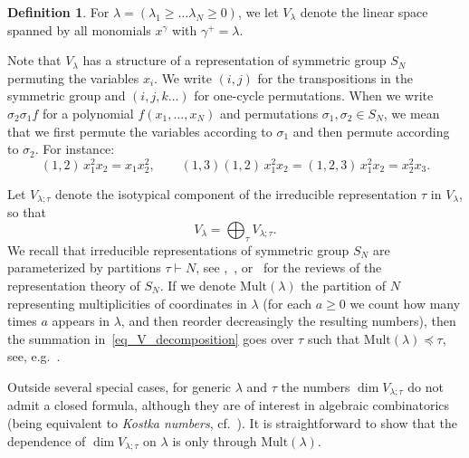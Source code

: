 \documentclass[11pt]{article}
\theoremstyle{definition}
\newtheorem{defi}[theo]{Definition}
\numberwithin{equation}{section}
\begin{document}
\begin{defi} \label{Definition_V_lambda}
 For $\lambda=(\lambda_1\ge\dots\lambda_N\ge 0)$, we let $V_\lambda$ denote the linear space spanned by all monomials $x^{\gamma}$ with $\gamma^+=\lambda$.
\end{defi}

Note that $V_\lambda$ has a structure of a representation of symmetric group $S_N$ permuting the variables $x_i$. We write $(i,j)$ for the transpositions in the symmetric group and $(i,j,k\dots)$ for one-cycle permutations. When we write $\sigma_2 \sigma_1 f$ for a polynomial $f(x_1,\dots,x_N)$ and permutations $\sigma_1,\sigma_2\in S_N$, we mean that we first permute the variables according to $\sigma_1$ and then permute according to $\sigma_2$. For instance:
$$
 (1,2)\, x_1^2 x_2 = x_1 x_2^2,\qquad (1,3) (1,2)\, x_1^2 x_2 = (1,2,3)\, x_1^2 x_2= x_2^2 x_3.
$$

Let $V_{\lambda;\tau}$ denote the isotypical component of the irreducible representation $\tau$ in $V_\lambda$, so that
\begin{equation}
\label{eq_V_decomposition}
 V_\lambda=\bigoplus_{\tau} V_{\lambda;\tau}.
\end{equation}
We recall that irreducible representations of symmetric group $S_N$ are parameterized by partitions $\tau\vdash N$, see \cite[Section I.7]{macdonald1998symmetric},~\cite{okounkov1996new}, or~\cite{james2006representation}  for the reviews of the representation theory of $S_N$. If we denote $\mathrm{Mult}(\lambda)$ the partition of $N$ representing multiplicities of coordinates in $\lambda$ (for each $a\ge 0$ we count how many times $a$ appears in $\lambda$, and then reorder decreasingly the resulting numbers), then the summation in~\eqref{eq_V_decomposition} goes over $\tau$ such that $\mathrm{Mult}(\lambda)\preceq \tau$, see, e.g.\ \cite[Remark on page 115]{macdonald1998symmetric}.

Outside several special cases, for generic $\lambda$ and $\tau$ the numbers $\dim V_{\lambda;\tau}$ do not admit a closed formula, although they are of interest in algebraic combinatorics (being equivalent to \emph{Kostka numbers}, cf.\ \cite[Section I.6]{macdonald1998symmetric}). It is straightforward to show that the dependence of $\dim V_{\lambda;\tau}$ on $\lambda$ is only through $\mathrm{Mult}(\lambda)$.
\end{document}
